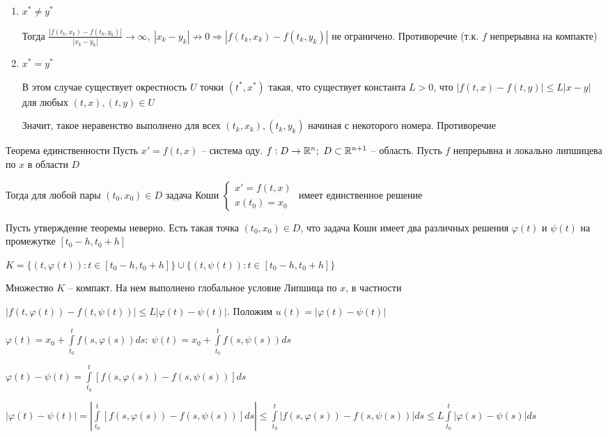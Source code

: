 \documentclass[12pt]{article}
\begin{document}
\begin{enumerate}
    \item $x^* \neq y^*$

    Тогда $\frac{|f(t_k, x_k) - f(t_k, y_k)|}{|x_k - y_k|} \to \infty,\ |x_k - y_k| \not\to 0 \Rightarrow |f(t_k, x_k) - f(t_k, y_k)|$ не ограничено. Противоречие (т.к. $f$ непрерывна на компакте)

    \item $x^* = y^*$
    
    В этом случае существует окрестность $U$ точки $(t^*, x^*)$ такая, что существует константа $L > 0$, что $|f(t, x) - f(t, y)| \leq L|x - y|$ для любых $(t, x), (t, y) \in U$

    Значит, такое неравенство выполнено для всех $(t_k, x_k), (t_k, y_k)$ начиная с некоторого номера. Противоречие
\end{enumerate}

\begin{theo}{Теорема единственности}
    Пусть $x' = f(t, x)$ -- система оду. $f : D \to \mathbb R^n;\ D \subset \mathbb R^{n + 1}$ -- область. Пусть $f$ непрерывна и локально липшицева по $x$ в области $D$

    Тогда для любой пары $(t_0, x_0) \in D$ задача Коши $\begin{cases}
        x' = f(t, x) \\
        x(t_0) = x_0
    \end{cases}$ имеет единственное решение
\end{theo}

Пусть утверждение теоремы неверно. Есть такая точка $(t_0, x_0) \in D$, что задача Коши имеет два различных решения $\varphi(t)$ и $\psi(t)$ на промежутке $[t_0 - h, t_0 + h]$

$K = \{(t, \varphi(t)) : t \in [t_0 - h, t_0 + h]\} \cup \{(t, \psi(t)) : t \in [t_0 - h, t_0 + h]\}$

Множество $K$ -- компакт. На нем выполнено глобальное условие Липшица по $x$, в частности 

$|f(t, \varphi(t)) - f(t, \psi(t))| \leq L|\varphi(t) - \psi(t)|$. Положим $u(t) = |\varphi(t) - \psi(t)|$

$\varphi(t) = x_0 + \int\limits_{t_0}^t f(s, \varphi(s))ds;\ \psi(t) = x_0 + \int\limits_{t_0}^t f(s, \psi(s))ds$

$\varphi(t) - \psi(t) = \int\limits_{t_0}^t \left[ f(s, \varphi(s)) - f(s, \psi(s)) \right] ds$

$|\varphi(t) - \psi(t)| = \left| \int\limits_{t_0}^t \left[ f(s, \varphi(s)) - f(s, \psi(s)) \right] ds \right| \leq \int\limits_{t_0}^t |f(s, \varphi(s)) - f(s, \psi(s))| ds \leq L\int\limits_{t_0}^t |\varphi(s) - \psi(s)| ds$
\end{document}
